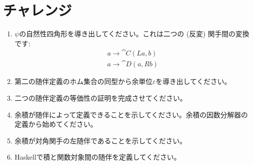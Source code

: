 \section{チャレンジ}

\begin{enumerate}
  \tightlist
  \item
    $\psi$の自然性四角形を導き出してください。これは二つの (反変) 関手間の変換です: 
        \begin{gather*}
          a \to \cat{C}(L a, b) \\
          a \to \cat{D}(a, R b)
        \end{gather*}
  \item
    第二の随伴定義のホム集合の同型から余単位$\varepsilon$を導き出してください。
  \item
    二つの随伴定義の等価性の証明を完成させてください。
  \item
    余積が随伴によって定義できることを示してください。余積の因数分解器の定義から始めてください。
  \item
    余積が対角関手の左随伴であることを示してください。
  \item
    Haskellで積と関数対象間の随伴を定義してください。
\end{enumerate}



